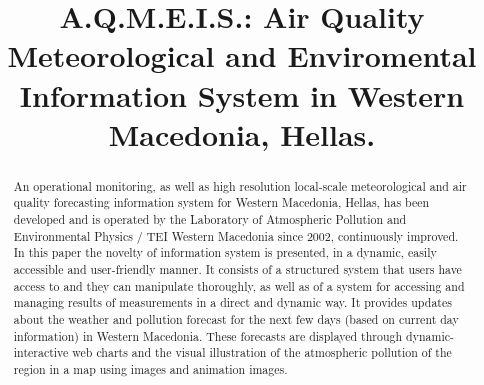 \documentclass[conference]{IEEEtran}
\begin{document}
\title{A.Q.M.E.I.S.: Air Quality Meteorological and Enviromental Information System in Western Macedonia, Hellas.}

\author{
\and
{}
\and
{}
}













\maketitle

\begin{abstract}
An operational monitoring, as well as high resolution local-scale meteorological and air quality forecasting information system for Western Macedonia, Hellas, has been developed and is operated by the Laboratory of Atmospheric Pollution and Environmental Physics / TEI Western Macedonia since 2002, continuously improved. In this paper the novelty of information system  is presented, in a dynamic, easily accessible and user-friendly manner.
It consists of a structured system that users have access to and they can manipulate thoroughly, as well as of a system for accessing and managing results of measurements in a direct and dynamic way. It provides updates about the weather and pollution forecast for the next few days (based on current day information) in Western Macedonia. These forecasts are displayed through dynamic-interactive web charts and the visual illustration of the atmospheric pollution of the region in a map using images and animation images. 
\end{abstract}
\end{document}
